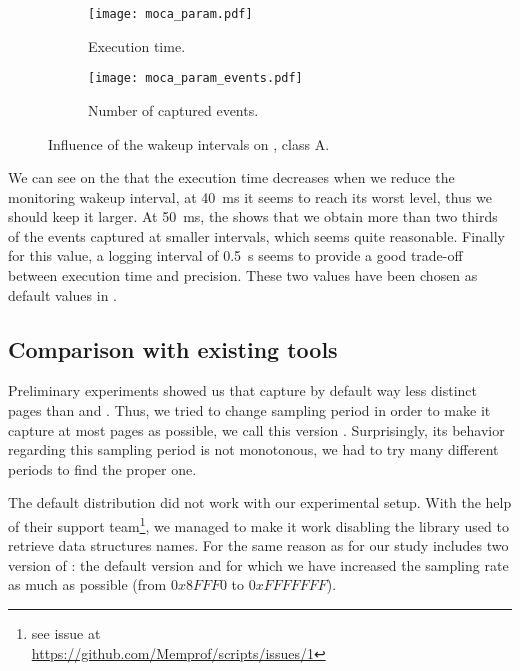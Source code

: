 \begin{figure}[htb]
    \centering
    \begin{subfigure}{\linewidth}
        \texttt{[image: moca\_param.pdf]}
        \caption{Execution time.}
        \label{fig:param_time}
    \end{subfigure}
    \begin{subfigure}{\linewidth}
        \texttt{[image: moca\_param\_events.pdf]}
        \caption{Number of captured events.}
        \label{fig:param_evts}
    \end{subfigure}
    \caption{Influence of the wakeup intervals on \IS, class A.}
    \label{fig:param}
\end{figure}

We can see on the  that the execution time decreases when we
reduce the monitoring wakeup interval, at \SI{40}{ms}
it seems to reach its worst level, thus we should keep it larger. At \SI{50}{ms}, the
 shows that we obtain more than two thirds of the events captured
at smaller intervals, which seems quite reasonable. Finally for this value, a logging
interval of \SI{0.5}{s} seems to provide a good trade-off  between
execution time and precision.
These two values have been chosen as default values in \Moca.



\subsection{Comparison with existing tools}
\label{sec:expe-ovh}

Preliminary experiments showed us that \Mitos capture by
default way less distinct pages than \TABARNAC and \Moca. Thus, we tried to change \Mitos
sampling period in order to make it capture at most pages as possible, 
we call this version \MitosTun. Surprisingly, its behavior regarding this sampling period
is not monotonous, we had to try many different periods to find the proper one.

The default \MemProf distribution did not work with our experimental setup. With the help
of their support team\footnote{see issue at\\\url{https://github.com/Memprof/scripts/issues/1}}, we managed to make it work  disabling the library used to retrieve
data structures names. For the same reason as for \Mitos our study includes
two version of \MemProf: the default version and \MemProfTun for which we have
increased the sampling rate as much as possible (from $0x8FFF0$ to
$0xFFFFFFF$).


